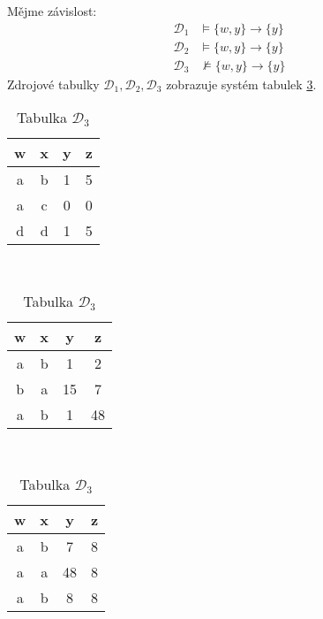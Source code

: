 \begin{upexample}\label{prik:funk}
Mějme závislost:
\begin{align*}
\mathcal{D}_{1} &\vDash \{ w, y \} \to \{ y \} \\
\mathcal{D}_{2} &\vDash \{ w, y \} \to \{ y \} \\
\mathcal{D}_{3} &\nvDash \{ w, y \} \to \{ y \}
\end{align*}
Zdrojové tabulky $\mathcal{D}_{1}, \mathcal{D}_{2}, \mathcal{D}_{3}$ zobrazuje systém tabulek \ref{tab:funk}.

\begin{table}
\caption{Tabulky k příkladu \ref{prik:funk}}\label{tab:funk}
\begin{subtable}[t]{0.3\textwidth}
\centering
\caption{Tabulka $\mathcal{D}_{1}$}
\begin{tabular}{c c c c}
w & x & y & z \\
\hline
a & b & 1 & 5 \\
a & c & 0 & 0 \\
d & d & 1 & 5
\end{tabular}
\end{subtable}
~
\begin{subtable}[t]{0.3\textwidth}
\centering
\caption{Tabulka $\mathcal{D}_{2}$}
\begin{tabular}{c c c c}
w & x & y & z \\
\hline
\cellcolor{green}a & \cellcolor{green}b & \cellcolor{green}1 & 2 \\
b & a & 15 & 7 \\
\cellcolor{green}a & \cellcolor{green}b & \cellcolor{green}1 & 48
\end{tabular}
\end{subtable}
~
\begin{subtable}[t]{0.3\textwidth}
\centering
\caption{Tabulka $\mathcal{D}_{3}$}
\begin{tabular}{c c c c}
w & x & y & z \\
\hline
\cellcolor{green}a & \cellcolor{green}b & \cellcolor{red}7 & 8 \\
a & a & 48 & 8 \\
\cellcolor{green}a & \cellcolor{green}b & \cellcolor{red}8 & 8
\end{tabular}
\end{subtable}
\end{table}
\end{upexample}

